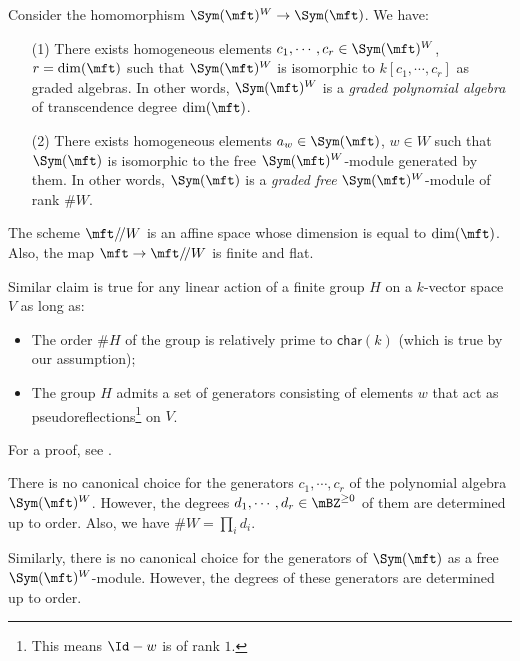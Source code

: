 	\begin{thm}
		\label{thm-CST}
		Consider the homomorphism $\Sym(\mft)^W\to \Sym(\mft)$. We have:
		\begin{itemize}
			\item[(1)]
				There exists homogeneous elements $c_1,\cdots,c_r\in \Sym(\mft)^W$, $r=\dim(\mft)$ such that $\Sym(\mft)^W$ is isomorphic to $k[c_1,\cdots,c_r]$ as graded algebras. In other words, $\Sym(\mft)^W$ is a \emph{graded polynomial algebra} of transcendence degree $\dim(\mft)$.
			\item[(2)]
				There exists homogeneous elements $a_w \in \Sym(\mft)$, $w\in W$ such that $\Sym(\mft)$ is isomorphic to the free $\Sym(\mft)^W$-module generated by them. In other words, $\Sym(\mft)$ is a \emph{graded free} $\Sym(\mft)^W$-module of rank $\# W$.		
		\end{itemize}
	\end{thm}

	\begin{cor}
		\label{cor-CST}
		The scheme $ \mft/\!/W $ is an affine space whose dimension is equal to $\dim(\mft)$. Also, the map $\mft \to  \mft/\!/W$ is finite and flat.
	\end{cor}

	\begin{rem}
		Similar claim is true for any linear action of a finite group $H$ on a $k$-vector space $V$ as long as:
		\begin{itemize}
			\item
				The order $\# H$ of the group is relatively prime to $\mathsf{char}(k)$ (which is true by our assumption);
			\item
				The group $H$ admits a set of generators consisting of elements $w$ that act as pseudoreflections\footnote{This means $\Id - w$ is of rank $1$.} on $V$.
		\end{itemize}
		For a proof, see \cite[Sect. 5]{Bo}.
	\end{rem}

	\begin{rem}
		There is no canonical choice for the generators $c_1,\cdots,c_r$ of the polynomial algebra $\Sym(\mft)^W$. However, the degrees $d_1,\cdots,d_r \in \mBZ^{\ge 0}$ of them are determined up to order. Also, we have $\# W = \prod_i d_i$.

		Similarly, there is no canonical choice for the generators of $\Sym(\mft)$ as a free $\Sym(\mft)^W$-module. However, the degrees of these generators are determined up to order.
	\end{rem}

